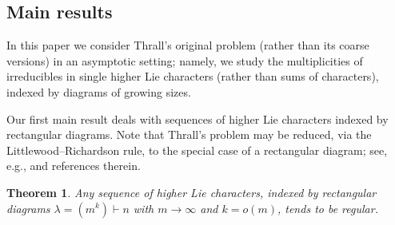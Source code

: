 \documentclass[12pt]%
{amsart}
\renewcommand\S{{\mathcal S}}
\newcommand{\la}{{\lambda}}
\theoremstyle{plain}
\newtheorem{theorem}{Theorem}[section]
\newtheorem{question}[theorem]{Question}
\theoremstyle{definition}
\theoremstyle{remark}
\newcommand{\todo}[1]{\vspace{5 mm}\par \noindent
	\marginpar{\textsc{ToDo}} \framebox{\begin{minipage}[c]{0.95
				\textwidth}
			#1 \end{minipage}}\vspace{5 mm}\par}
\begin{document}







\subsection{Main results}\label{sec:main_results}

In this paper we consider
Thrall's original problem (rather than its coarse versions) in an asymptotic setting; namely, we study the multiplicities of irreducibles in single higher Lie characters (rather than sums of characters), indexed by diagrams of growing sizes.  

Our first main result deals with sequences of higher Lie characters indexed by rectangular diagrams. 
Note that Thrall's problem may be reduced, via the Littlewood--Richardson rule, to the special case of a rectangular diagram; see, e.g., \cite{Reiner-Banff} and references therein.  

\begin{theorem}\label{main:rectangular}
Any sequence of higher Lie characters, indexed by rectangular diagrams $\la = (m^k)\vdash n$ with
$m \to \infty$ and $k = o(m)$, tends to be regular. 
\end{theorem}
\end{document}
